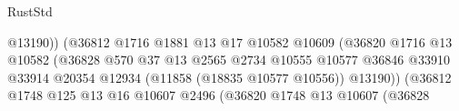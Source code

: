 \begin{lexlean}{RustStd}
\begin{coremodule}
                                                            @13190))
                                                        (@36812
                                                          @1716
                                                          @1881
                                                          @13
                                                          @17
                                                          @10582
                                                          @10609
                                                          (@36820
                                                            @1716
                                                            @13
                                                            @10582
                                                            (@36828
                                                              @570
                                                              @37
                                                              @13
                                                              @2565
                                                              @2734
                                                              @10555
                                                              @10577
                                                              @36846
                                                              @33910
                                                              @33914
                                                              @20354
                                                              @12934
                                                              (@11858 (@18835 @10577 @10556))
                                                              @13190))
                                                          (@36812
                                                            @1748
                                                            @125
                                                            @13
                                                            @16
                                                            @10607
                                                            @2496
                                                            (@36820
                                                              @1748
                                                              @13
                                                              @10607
                                                              (@36828

\end{coremodule}
\end{lexlean}
